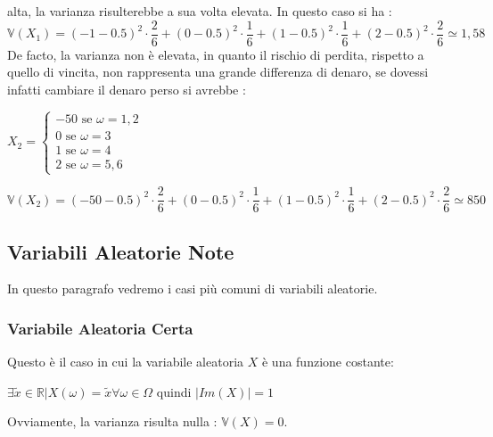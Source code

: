 \documentclass[12pt, letterpaper]{article}
\begin{document}
alta, la varianza risulterebbe a sua volta elevata. In questo caso si ha :
\begin{equation}
    \mathbb{V}(X_1)=(-1-0.5)^2\cdot \dfrac{2}{6}+(0-0.5)^2\cdot \dfrac{1}{6}+(1-0.5)^2\cdot \dfrac{1}{6}+(2-0.5)^2\cdot \dfrac{2}{6}\simeq1,58
\end{equation}
De facto, la varianza non è elevata, in quanto il rischio di perdita, rispetto a quello di vincita, non rappresenta una grande differenza di denaro,
se dovessi infatti cambiare il denaro perso si avrebbe :
\begin{center}
    \(
    X_2=\begin{cases}
        -50\text{ se }\omega=1,2\\
        0\text{ se  }\omega=3\\
        1\text{  se }\omega=4\\
        2\text{ se  }\omega=5,6
    \end{cases}    
    \)
\end{center}
\begin{equation}
    \mathbb{V}(X_2)=(-50-0.5)^2\cdot \dfrac{2}{6}+(0-0.5)^2\cdot \dfrac{1}{6}+(1-0.5)^2\cdot \dfrac{1}{6}+(2-0.5)^2\cdot \dfrac{2}{6}\simeq850
\end{equation}
\subsection{Variabili Aleatorie Note}
In questo paragrafo vedremo i casi più comuni di variabili aleatorie.
\subsubsection{Variabile Aleatoria Certa}
Questo è il caso in cui la variabile aleatoria \(X\) è una funzione costante:\begin{center}
   \(\exists\tilde x\in \mathbb{R}|X(\omega)=\tilde x \forall \omega\in \Omega\) quindi \(|Im(X)|=1\)
\end{center}
Ovviamente, la varianza risulta nulla : \(\mathbb{V}(X)=0\).
\end{document}
